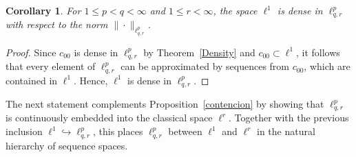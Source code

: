 \documentclass[preprint,12pt]{elsarticle}
\newtheorem{corollary}{Corollary}[theorem]
\begin{document}
\begin{corollary}
\label{cor:density-L1}
For \(1 \leq p < q < \infty\) and \(1 \leq r < \infty\), the space \(\ell^1\) is dense in \(\ell^p_{q,r}\) with respect to the norm \(\|\cdot\|_{\ell^p_{q,r}}\).
\end{corollary}
\begin{proof}
Since \(c_{00}\) is dense in \(\ell^p_{q,r}\) by Theorem~\ref{Density} and \(c_{00} \subset \ell^1\), it follows that every element of \(\ell^p_{q,r}\) can be approximated by sequences from \(c_{00}\), which are contained in \(\ell^1\). Hence, \(\ell^1\) is dense in \(\ell^p_{q,r}\).
\end{proof}
   
The next statement complements Proposition~\ref{contencion} 
by showing that $\ell^{p}_{q,r}$ is continuously embedded into the classical space $\ell^{r}$. 
Together with the previous inclusion $\ell^{1}\hookrightarrow\ell^{p}_{q,r}$,
this places $\ell^{p}_{q,r}$ between $\ell^{1}$ and $\ell^{r}$ in the natural hierarchy of sequence spaces. 
\end{document}
